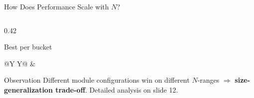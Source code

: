 \documentclass[aspectratio=169,11pt]{beamer}
\begin{document}
\begin{frame}[t]{How Does Performance Scale with $N$?}
\begin{columns}[T,onlytextwidth]
\begin{column}{0.42\textwidth}
\begin{block}{Best per bucket}
\begin{tabularx}{\linewidth}{@{}Y Y@{}}
            &  \\
          \bottomrule
        \end{tabularx}
      \end{block}
      \begin{alertblock}{Observation}
        \scriptsize
        Different module configurations win on different $N$-ranges $\Rightarrow$ \textbf{size-generalization trade-off}. Detailed analysis on slide 12.
      \end{alertblock}
    \end{column}
  \end{columns}
\end{frame}
\end{document}
